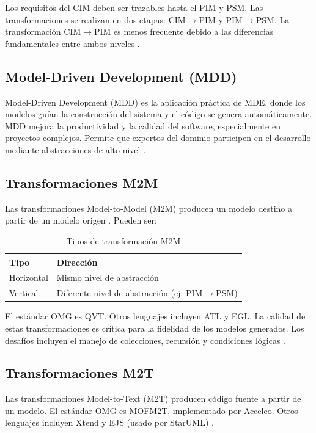 \documentclass[journal,onecolumn]{IEEEtran}
\begin{document}
Los requisitos del CIM deben ser trazables hasta el PIM y PSM. Las transformaciones se realizan en dos etapas: CIM$\rightarrow$PIM y PIM$\rightarrow$PSM. La transformación CIM$\rightarrow$PIM es menos frecuente debido a las diferencias fundamentales entre ambos niveles \cite{Zammel2025}.

\subsection{Model-Driven Development (MDD)}

Model-Driven Development (MDD) es la aplicación práctica de MDE, donde los modelos guían la construcción del sistema y el código se genera automáticamente. MDD mejora la productividad y la calidad del software, especialmente en proyectos complejos. Permite que expertos del dominio participen en el desarrollo mediante abstracciones de alto nivel \cite{Domingo2020}.

\subsection{Transformaciones M2M}

Las transformaciones Model-to-Model (M2M) producen un modelo destino a partir de un modelo origen \cite{Troya2023}. Pueden ser:

\begin{table}[H]
	\centering
	\caption{Tipos de transformación M2M}
	\label{tab:m2m-tipos}
	\begin{tabular}{|l|p{7cm}|}
		\hline
		\textbf{Tipo} & \textbf{Dirección} \\
		\hline
		Horizontal & Mismo nivel de abstracción \\
		\hline
		Vertical & Diferente nivel de abstracción (ej. PIM$\rightarrow$PSM) \\
		\hline
	\end{tabular}
\end{table}

El estándar OMG es QVT. Otros lenguajes incluyen ATL y EGL. La calidad de estas transformaciones es crítica para la fidelidad de los modelos generados. Los desafíos incluyen el manejo de colecciones, recursión y condiciones lógicas \cite{Troya2023}.

\subsection{Transformaciones M2T}

Las transformaciones Model-to-Text (M2T) producen código fuente a partir de un modelo. El estándar OMG es MOFM2T, implementado por Acceleo. Otros lenguajes incluyen Xtend y EJS (usado por StarUML) \cite{Zafar2024}.
\end{document}
